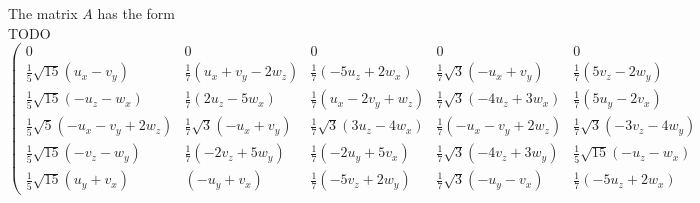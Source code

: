 \begin{frame}
	The matrix $A$ has the form \\
	TODO
	\tiny
	\begin{equation*}
		\left(\begin{array}{lllll}
			0 & 0 & 0 & 0 & 0\\
			\frac{1}{5} \sqrt{15}\left(u_x-v_y\right) & \frac{1}{7}\left(u_x+v_y-2 w_z\right) & \frac{1}{7}\left(-5 u_z+2 w_x\right) & \frac{1}{7} \sqrt{3}\left(-u_x+v_y\right) &\frac{1}{7} \left(5v_z-2w_y\right)\\
			\frac{1}{5} \sqrt{15}\left(-u_z-w_x\right) & \frac{1}{7}\left(2 u_z-5 w_x\right) & \frac{1}{7}\left(u_x-2 v_y+w_z\right) & \frac{1}{7} \sqrt{3}\left(-4u_z+3w_x\right)&\frac{1}{7} \left(5u_y-2v_x\right)\\
			\frac{1}{5} \sqrt{5}\left(-u_x-v_y+2 w_z\right) & \frac{1}{7} \sqrt{3}\left(-u_x+v_y\right) & \frac{1}{7} \sqrt{3}\left(3 u_z-4 w_x\right) & \frac{1}{7} \left(-u_x-v_y + 2w_z\right)&\frac{1}{7} \sqrt{3}\left(-3v_z-4w_y\right) \\
			\frac{1}{5} \sqrt{15}\left(-v_z-w_y\right) & \frac{1}{7}\left(-2 v_z+5 w_y\right) & \frac{1}{7}\left(-2 u_y+5 v_x\right)& \frac{1}{7} \sqrt{3}\left(-4v_z+3w_y\right)&\frac{1}{5} \sqrt{15}\left(-u_z-w_x\right) \\
			\frac{1}{5} \sqrt{15}\left(u_y+v_x\right) & \left(-u_y+v_x\right) & \frac{1}{7}\left(-5 v_z+2 w_y\right) & \frac{1}{7} \sqrt{3}\left(-u_y-v_x\right)&\frac{1}{7} \left(-5u_z+2w_x\right)
		\end{array}\right.
	\end{equation*}
\end{frame}


